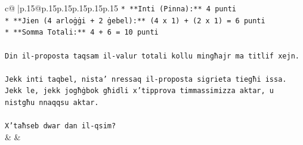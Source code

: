 \documentclass{article}
\begin{document}
{\begin{supertabular}{c@{$\;$}|p{.15\linewidth}@{}p{.15\linewidth}p{.15\linewidth}p{.15\linewidth}p{.15\linewidth}p{.15\linewidth}}
{{{\texttt{*   **Inti (Pinna):** 4 punti} \\
\texttt{*   **Jien (4 arloġġi + 2 ġebel):** (4 x 1) + (2 x 1) = 6 punti} \\
\texttt{*   **Somma Totali:** 4 + 6 = 10 punti} \\
\\ 
\texttt{Din il{-}proposta taqsam il{-}valur totali kollu mingħajr ma titlif xejn.} \\
\\ 
\texttt{Jekk inti taqbel, nista' nressaq il{-}proposta sigrieta tiegħi issa. Jekk le, jekk jogħġbok għidli x'tipprova timmassimizza aktar, u nistgħu nnaqqsu aktar.} \\
\\ 
\texttt{X'taħseb dwar dan il{-}qsim?} \\
            }
        }
    }
    & & \\ \\


\end{supertabular}}
\end{document}
